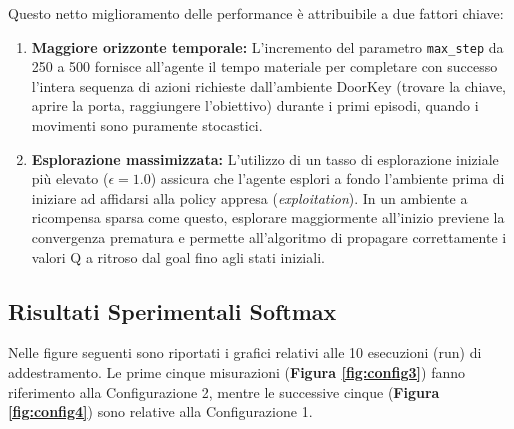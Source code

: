 \documentclass[12pt,a4paper]{article}
\begin{document}
Questo netto miglioramento delle performance è attribuibile a due fattori chiave:
\begin{enumerate}
    \item \textbf{Maggiore orizzonte temporale:} L'incremento del parametro \texttt{max\_step} da 250 a 500 fornisce all'agente il tempo materiale per completare con successo l'intera sequenza di azioni richieste dall'ambiente DoorKey (trovare la chiave, aprire la porta, raggiungere l'obiettivo) durante i primi episodi, quando i movimenti sono puramente stocastici.
    \item \textbf{Esplorazione massimizzata:} L'utilizzo di un tasso di esplorazione iniziale più elevato ($\epsilon = 1.0$) assicura che l'agente esplori a fondo l'ambiente prima di iniziare ad affidarsi alla policy appresa (\textit{exploitation}). In un ambiente a ricompensa sparsa come questo, esplorare maggiormente all'inizio previene la convergenza prematura e permette all'algoritmo di propagare correttamente i valori Q a ritroso dal goal fino agli stati iniziali.
\end{enumerate}

\subsection{Risultati Sperimentali Softmax}
\label{cap:softmax}

Nelle figure seguenti sono riportati i grafici relativi alle 10 esecuzioni (run) di addestramento. Le prime cinque misurazioni (\textbf{Figura \ref{fig:config3}}) fanno riferimento alla Configurazione 2, mentre le successive cinque (\textbf{Figura \ref{fig:config4}}) sono relative alla Configurazione 1.

\pagebreak
\end{document}
